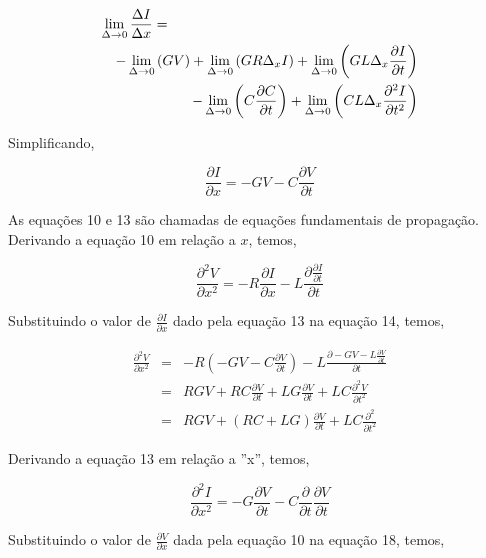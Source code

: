 \documentclass[a4paper, 10pt]{article}
\begin{document}
\begin{eqnarray}
\lefteqn{\lim_{\Delta \to 0}{\frac{\Delta I}{\Delta x}} =}\nonumber\\
& &- \lim_{\Delta \to 0}{(GV)} + \lim_{\Delta \to 0}{(G R \Delta_x I)} + \lim_{\Delta \to 0}{\left(G L \Delta_x \frac{\partial I}{\partial t}\right)}\nonumber\\ 
& &- \lim_{\Delta \to 0}{\left( C \frac{\partial C}{\partial t}\right)} + \lim_{\Delta \to 0}{\left(C L \Delta_x \frac{\partial^2 I}{\partial t^2}\right)}
\end{eqnarray}

Simplificando,

\begin{equation}
\frac{\partial I}{\partial x} = - G V - C \frac{\partial V}{\partial t}
\end{equation}

As equações 10 e 13 são chamadas de equações fundamentais de propagação.
Derivando a equação 10 em relação a $x$, temos,

\begin{equation}
\frac{\partial^2 V}{\partial x^2} = -R \frac{\partial I}{\partial x} - L \frac{\partial \frac{\partial I}{\partial t}}{\partial t}
\end{equation}

Substituindo o valor de $\frac{\partial I}{\partial x}$ dado pela equação
13 na equação 14, temos,

\begin{eqnarray}
\frac{\partial^2 V}{\partial x^2} &=& - R \left( - G V - C \frac{\partial V}{\partial t}\right) - L \frac{\partial -G V - L \frac{\partial V}{\partial t}}{\partial t} \\
&=&R G V + R C \frac{\partial V}{\partial t} + L G \frac{\partial V}{\partial t} + L C \frac{\partial^2 V}{\partial t^2} \\
&=&R G V + (R C + L G)\frac{\partial V}{\partial t} + L C \frac{\partial^2}{\partial t^2}
\end{eqnarray}

Derivando a equação 13 em relação a ''x'', temos,

\begin{equation}
\frac{\partial^2 I}{\partial x^2} =  - G \frac{\partial V}{\partial t} - C \frac{\partial }{\partial t}\frac{\partial V}{\partial t}
\end{equation}

Substituindo o valor de $\frac{\partial V}{\partial x}$ dada pela equação
10 na equação 18, temos,
\end{document}
